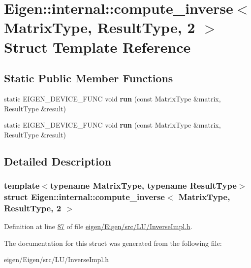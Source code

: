 \hypertarget{struct_eigen_1_1internal_1_1compute__inverse_3_01_matrix_type_00_01_result_type_00_012_01_4}{}\section{Eigen\+:\+:internal\+:\+:compute\+\_\+inverse$<$ Matrix\+Type, Result\+Type, 2 $>$ Struct Template Reference}
\label{struct_eigen_1_1internal_1_1compute__inverse_3_01_matrix_type_00_01_result_type_00_012_01_4}
\subsection*{Static Public Member Functions}
\begin{DoxyCompactItemize}
\item 
\mbox{\label{struct_eigen_1_1internal_1_1compute__inverse_3_01_matrix_type_00_01_result_type_00_012_01_4_a2180ced5f49fe944a9bdcdd0d45db391}} 
static E\+I\+G\+E\+N\+\_\+\+D\+E\+V\+I\+C\+E\+\_\+\+F\+U\+NC void {\bfseries run} (const Matrix\+Type \&matrix, Result\+Type \&result)
\item 
\mbox{\label{struct_eigen_1_1internal_1_1compute__inverse_3_01_matrix_type_00_01_result_type_00_012_01_4_a2180ced5f49fe944a9bdcdd0d45db391}} 
static E\+I\+G\+E\+N\+\_\+\+D\+E\+V\+I\+C\+E\+\_\+\+F\+U\+NC void {\bfseries run} (const Matrix\+Type \&matrix, Result\+Type \&result)
\end{DoxyCompactItemize}


\subsection{Detailed Description}
\subsubsection*{template$<$typename Matrix\+Type, typename Result\+Type$>$\newline
struct Eigen\+::internal\+::compute\+\_\+inverse$<$ Matrix\+Type, Result\+Type, 2 $>$}



Definition at line \hyperlink{eigen_2_eigen_2src_2_l_u_2_inverse_impl_8h_source_l00087}{87} of file \hyperlink{eigen_2_eigen_2src_2_l_u_2_inverse_impl_8h_source}{eigen/\+Eigen/src/\+L\+U/\+Inverse\+Impl.\+h}.



The documentation for this struct was generated from the following file\+:\begin{DoxyCompactItemize}
\item 
eigen/\+Eigen/src/\+L\+U/\+Inverse\+Impl.\+h\end{DoxyCompactItemize}
